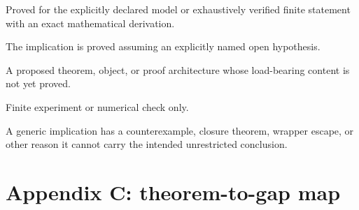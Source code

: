 \documentclass[11pt]{article}
\theoremstyle{plain}
\theoremstyle{definition}
\theoremstyle{remark}
\begin{document}
\begin{description}[leftmargin=1.8em,style=nextline]
\item[PROVED/EXACT]
Proved for the explicitly declared model or exhaustively verified finite
statement with an exact mathematical derivation.

\item[CONDITIONAL]
The implication is proved assuming an explicitly named open hypothesis.

\item[CANDIDATE]
A proposed theorem, object, or proof architecture whose load-bearing content is
not yet proved.

\item[COMPUTATIONAL]
Finite experiment or numerical check only.

\item[FALSIFIED/RETIRED]
A generic implication has a counterexample, closure theorem, wrapper escape, or
other reason it cannot carry the intended unrestricted conclusion.
\end{description}

\section{Appendix C: theorem-to-gap map}
\end{document}
